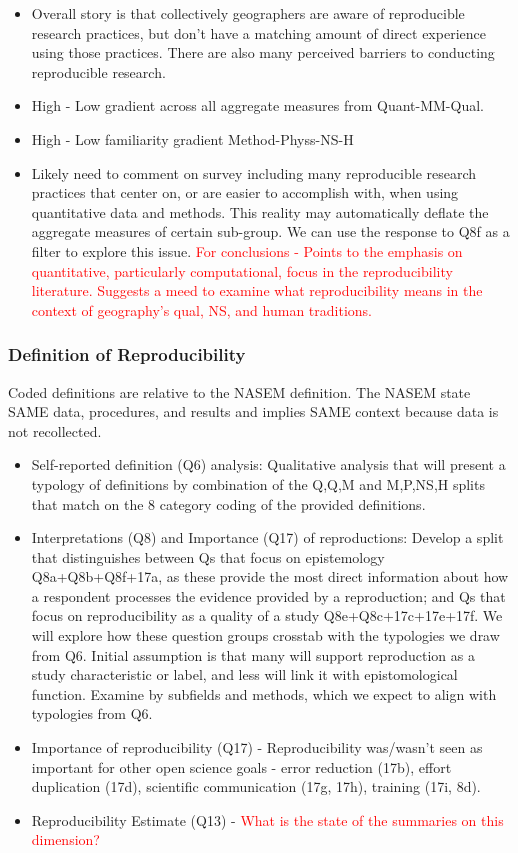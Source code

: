 \documentclass[]{interact}
\theoremstyle{plain}%
\theoremstyle{definition}
\theoremstyle{remark}
\begin{document}
\begin{itemize}
    \item Overall story is that collectively geographers are aware of reproducible research practices, but don't have a matching amount of direct experience using those practices. There are also many perceived barriers to conducting reproducible research.
    \item High - Low gradient across all aggregate measures from Quant-MM-Qual.
    \item High - Low familiarity gradient Method-Physs-NS-H
    \item Likely need to comment on survey including many reproducible research practices that center on, or are easier to accomplish with, when using quantitative data and methods. This reality may automatically deflate the aggregate measures of certain sub-group. We can use the response to Q8f as a filter to explore this issue. \textcolor{red}{For conclusions - Points to the emphasis on quantitative, particularly computational, focus in the reproducibility literature. Suggests a meed to examine what reproducibility means in the context of geography's qual, NS, and human traditions.} 
\end{itemize}

\subsubsection*{Definition of Reproducibility}
Coded definitions are relative to the NASEM definition. The NASEM state SAME data, procedures, and results and implies SAME context because data is not recollected. 
\begin{itemize}
    \item Self-reported definition (Q6) analysis: Qualitative analysis that will present a typology of definitions by combination of the Q,Q,M and M,P,NS,H splits that match on the 8 category coding of the provided definitions. 
    \item Interpretations (Q8) and Importance (Q17) of reproductions: Develop a split that distinguishes between Qs that focus on epistemology Q8a+Q8b+Q8f+17a, as these provide the most direct information about how a respondent processes the evidence provided by a reproduction; and Qs that focus on reproducibility as a quality of a study Q8e+Q8c+17c+17e+17f. We will explore how these question groups crosstab with the typologies we draw from Q6. Initial assumption is that many will support reproduction as a study characteristic or label, and less will link it with epistomological function. Examine by subfields and methods, which we expect to align with typologies from Q6. 
    \item Importance of reproducibility (Q17) - Reproducibility was/wasn't seen as important for other open science goals - error reduction (17b), effort duplication (17d), scientific communication (17g, 17h), training (17i, 8d).
    \item Reproducibility Estimate (Q13) - \textcolor{red}{What is the state of the summaries on this dimension?}
\end{itemize}
\end{document}
